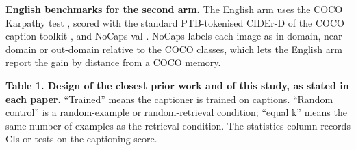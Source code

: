\documentclass[manuscript,screen]{acmart}
\begin{document}
\textbf{English benchmarks for the second arm.} The English arm uses the COCO Karpathy test
\citep{Lin2014COCO, Karpathy2015Split}, scored with the standard PTB-tokenised CIDEr-D of the COCO
caption toolkit \citep{Chen2015COCOCaptions}, and NoCaps val \citep{Agrawal2019NoCaps}. NoCaps
labels each image as in-domain, near-domain or out-domain relative to the COCO classes, which lets
the English arm report the gain by distance from a COCO memory.

\textbf{Table 1. Design of the closest prior work and of this study, as stated in each paper.}
``Trained'' means the captioner is trained on captions. ``Random control'' is a random-example or
random-retrieval condition; ``equal k'' means the same number of examples as the retrieval
condition. The statistics column records CIs or tests on the captioning score.
\end{document}
